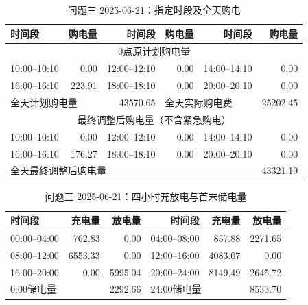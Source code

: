 \FloatBarrier
\begin{table}[htbp]\centering\scriptsize
\caption{问题三 2025-06-21：指定时段及全天购电}
\begin{tabular}{lrrrrr}\toprule
时间段 & 购电量 & 时间段 & 购电量 & 时间段 & 购电量\\\midrule
\multicolumn{6}{c}{0点原计划购电量}\\
10:00--10:10 & 0.00 & 12:00--12:10 & 0.00 & 14:00--14:10 & 0.00\\
16:00--16:10 & 223.91 & 18:00--18:10 & 0.00 & 20:00--20:10 & 0.00\\
\multicolumn{2}{l}{全天计划购电量} & 43570.65 & \multicolumn{2}{l}{全天实际购电费} & 25202.45\\
\multicolumn{6}{c}{最终调整后购电量（不含紧急购电）}\\
10:00--10:10 & 0.00 & 12:00--12:10 & 0.00 & 14:00--14:10 & 0.00\\
16:00--16:10 & 176.27 & 18:00--18:10 & 0.00 & 20:00--20:10 & 0.00\\
\multicolumn{5}{l}{全天最终调整后购电量} & 43321.19\\
\bottomrule\end{tabular}\end{table}

\begin{table}[htbp]\centering\scriptsize
\caption{问题三 2025-06-21：四小时充放电与首末储电量}
\begin{tabular}{lrrrrr}\toprule
时间段 & 充电量 & 放电量 & 时间段 & 充电量 & 放电量\\\midrule
00:00--04:00 & 762.83 & 0.00 & 04:00--08:00 & 857.88 & 2271.65\\
08:00--12:00 & 6553.33 & 0.00 & 12:00--16:00 & 4083.07 & 0.00\\
16:00--20:00 & 0.00 & 5995.04 & 20:00--24:00 & 8149.49 & 2645.72\\
\multicolumn{2}{l}{0:00储电量} & 2292.66 & \multicolumn{2}{l}{24:00储电量} & 8533.70\\
\bottomrule\end{tabular}\end{table}

